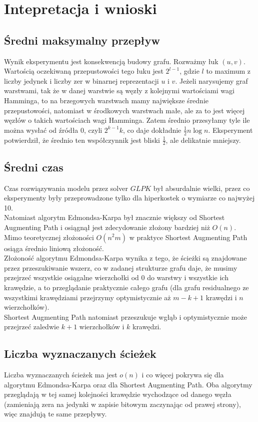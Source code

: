 \documentclass{article}
\begin{document}
\section{Intepretacja i wnioski}
\subsection{Średni maksymalny przepływ}
Wynik eksperymentu jest konsekwencją budowy grafu. Rozważmy łuk $(u,v)$. Wartością oczekiwaną przepustowości tego łuku jest $2^{l-1}$, gdzie $l$ to maximum z liczby jedynek i liczby zer w binarnej reprezentacji $u$ i $v$. Jeżeli narysujemy graf warstwami, tak że w danej warstwie są węzły z kolejnymi wartościami wagi Hamminga, to na brzegowych warstwach mamy największe średnie przepustowości, natomiast w środkowych warstwach małe, ale za to jest więcej węzłów o takich wartościach wagi Hamminga. Zatem średnio przesyłamy tyle ile można wysłać od źródła $0$, czyli $2^{k-1} k$, co daje dokładnie $\frac{1}{2}n\log n$. Eksperyment potwierdził, że średnio ten współczynnik jest bliski $\frac{1}{2}$, ale delikatnie mniejszy.
\subsection{Średni czas}
Czas rozwiązywania modelu przez solver $GLPK$ był absurdalnie wielki, przez co eksperymenty były przeprowadzone tylko dla hiperkostek o wymiarze co najwyżej 10. \\
Natomiast algorytm Edmondsa-Karpa był znacznie większy od Shortest Augmenting Path i osiągnął jest zdecydowanie złożony bardziej niż $O(n)$. Mimo teoretycznej złożoności $O(n^2m)$ w praktyce Shortest Augmenting Path osiąga średnio liniową złożoność. \\
Złożoność algorytmu Edmondsa-Karpa wynika z tego, że ścieżki są znajdowane przez przeszukiwanie wszerz, co w zadanej strukturze grafu daje, że musimy przejrzeć wszystkie osiągalne wierzchołki od $0$ do warstwy i wszystkie ich krawędzie, a to przeglądanie praktycznie całego grafu (dla grafu residualnego ze wszystkimi krawędziami przejrzymy optymistycznie aż $m-k+1$ krawędzi i $n$ wierzchołków).\\
Shortest Augmenting Path natomiast przeszukuje wgłąb i optymistycznie może przejrzeć zaledwie $k+1$ wierzchołków i $k$ krawędzi.
\subsection{Liczba wyznaczanych ścieżek} 
Liczba wyznaczanych ścieżek ma jest $o(n)$ i co więcej pokrywa się dla algorytmu Edmondsa-Karpa oraz dla Shortest Augmenting Path. Oba algorytmy przeglądają w tej samej kolejności krawędzie wychodzące od danego węzła (zamieniają zera na jedynki w zapisie bitowym zaczynając od prawej strony), więc znajdują te same przepływy. 
\end{document}
